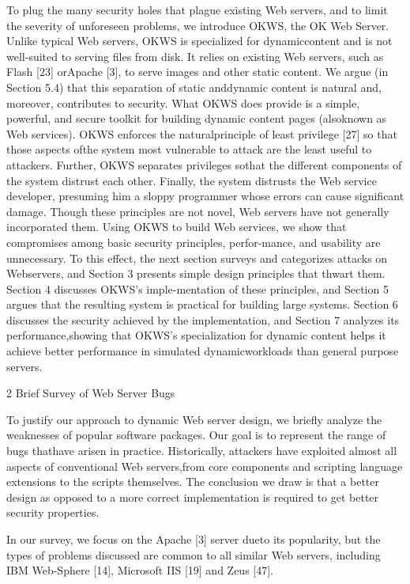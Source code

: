 To plug the many security holes that plague existing Web servers, and to limit
the severity of unforeseen problems, we introduce OKWS, the OK Web Server. 
Unlike typical Web servers, OKWS is specialized for dynamiccontent and is not
well-suited to serving files from disk.
It relies on existing Web servers, such as Flash [23] orApache [3], to serve
images and other static content. 
We argue (in Section 5.4) that this separation of static anddynamic content is
natural and, moreover, contributes to security.
What OKWS does provide is a simple, powerful, and secure toolkit for building
dynamic content pages (alsoknown as Web services). OKWS enforces the
naturalprinciple of least privilege [27] so that those aspects ofthe system most
vulnerable to attack are the least useful to attackers.
Further, OKWS separates privileges sothat the different components of the system
distrust each other.
Finally, the system distrusts the Web service developer, presuming him a sloppy
programmer whose errors can cause significant damage.
Though these principles are not novel, Web servers have not generally
incorporated them.
Using OKWS to build Web services, we show that compromises among basic security
principles, perfor-mance, and usability are unnecessary.
To this effect, the next section surveys and categorizes attacks on Webservers,
and Section 3 presents simple design principles that thwart them.
Section 4 discusses OKWS's imple-mentation of these principles, and Section 5
argues that the resulting system is practical for building large systems.
Section 6 discusses the security achieved by the implementation, and Section 7
analyzes its performance,showing that OKWS's specialization for dynamic content
helps it achieve better performance in simulated dynamicworkloads than general
purpose servers.

2 Brief Survey of Web Server Bugs

To justify our approach to dynamic Web server design, we briefly analyze the
weaknesses of popular software packages. 
Our goal is to represent the range of bugs thathave arisen in practice.
Historically, attackers have exploited almost all aspects of conventional Web
servers,from core components and scripting language extensions to the scripts
themselves. 
The conclusion we draw is that a better design as opposed to a more correct
implementation is required to get better security properties.

In our survey, we focus on the Apache [3] server dueto its popularity, but the
types of problems discussed are common to all similar Web servers, including
IBM Web-Sphere [14], Microsoft IIS [19] and Zeus [47].

